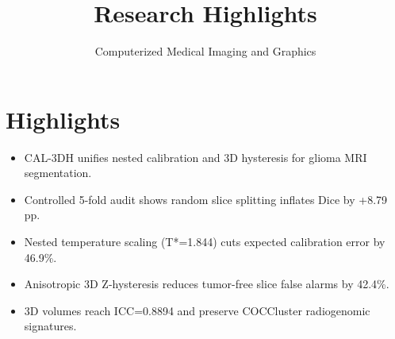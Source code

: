 \documentclass[12pt]{article}
\title{\textbf{Research Highlights}}
\author{Computerized Medical Imaging and Graphics}
\date{}
\begin{document}
\maketitle

\section*{Highlights}
\begin{itemize}
    \item CAL-3DH unifies nested calibration and 3D hysteresis for glioma MRI segmentation.
    \item Controlled 5-fold audit shows random slice splitting inflates Dice by +8.79 pp.
    \item Nested temperature scaling (T*=1.844) cuts expected calibration error by 46.9\%.
    \item Anisotropic 3D Z-hysteresis reduces tumor-free slice false alarms by 42.4\%.
    \item 3D volumes reach ICC=0.8894 and preserve COCCluster radiogenomic signatures.
\end{itemize}
\end{document}
